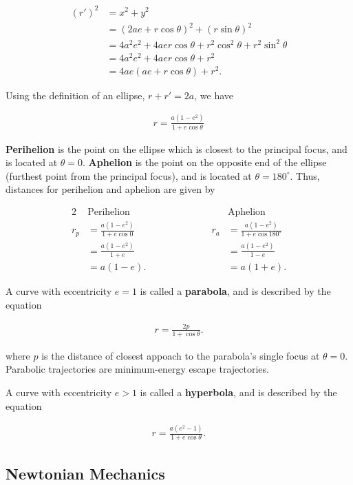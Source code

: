 \documentclass[a4paper,10pt]{article}
\begin{document}
\begin{align*}
    (r')^2 &= x^2 + y^2 \\
           &= (2ae + r\cos\theta)^2 + (r\sin\theta)^2 \\
           &= 4a^2e^2 + 4aer\cos\theta + r^2\cos^2\theta + r^2\sin^2\theta \\
           &= 4a^2e^2 + 4aer\cos\theta + r^2 \\
           &= 4ae(ae + r\cos\theta) + r^2.
\end{align*}

Using the definition of an ellipse, $r+r'=2a$, we have 

\begin{align*}
    r = \frac{a(1-e^2)}{1+e\cos\theta}
\end{align*}

\textbf{Perihelion} is the point on the ellipse which is closest to the principal focus, and is located at $\theta=0$. \textbf{Aphelion} is the point on the opposite end of the ellipse (furthest point from the principal focus), and is located at $\theta=180^\circ$. Thus, distances for perihelion and aphelion are given by 

\begin{alignat*}{2}
    &\text{Perihelion} &&\text{Aphelion} \\[0.2cm]
    r_p &= \frac{a(1-e^2)}{1+e\cos 0} &\qquad\qquad\qquad r_a &= \frac{a(1-e^2)}{1+e\cos 180^\circ} \\
        &= \frac{a(1-e^2)}{1+e} &&= \frac{a(1-e^2)}{1-e} \\
        &= a(1-e). &&= a(1+e).
\end{alignat*}

A curve with eccentricity $e=1$ is called a \textbf{parabola}, and is described by the equation 

\begin{align*}
    r = \frac{2p}{1+\cos\theta}.
\end{align*}

where $p$ is the distance of closest appoach to the parabola's single focus at $\theta=0$. Parabolic trajectories are minimum-energy escape trajectories. 

A curve with eccentricity $e>1$ is called a \textbf{hyperbola}, and is described by the equation

\begin{align*}
    r = \frac{a(e^2-1)}{1+e\cos\theta}.
\end{align*}

\subsection{Newtonian Mechanics}
\end{document}
